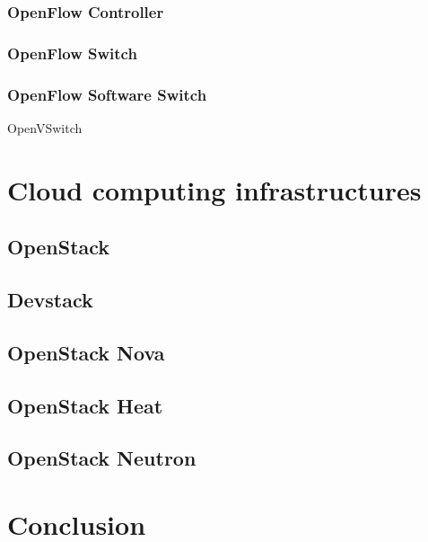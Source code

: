 \subsubsection{OpenFlow Controller}

\subsubsection{OpenFlow Switch}

\subsubsection{OpenFlow Software Switch}

OpenVSwitch

\section{Cloud computing infrastructures}

\subsection{OpenStack}

\subsection{Devstack}

\subsection{OpenStack Nova}

\subsection{OpenStack Heat}

\subsection{OpenStack Neutron}

\section{Conclusion}